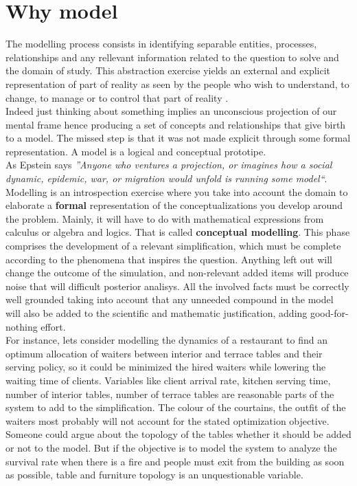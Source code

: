 \documentclass[11pt,oneside,a4paper,openright]{report}
\begin{document}
\section{Why model}
%
The modelling process consists in identifying separable entities, processes, relationships and any rellevant information related to the question to solve and the domain of study. 
This abstraction exercise yields an external and explicit representation of part of reality as seen by the
people who wish to understand, to change, to manage or to control that part of reality \cite{Pidd2003}.\\
Indeed just thinking about something implies an unconscious projection of our mental frame hence producing a set of concepts and relationships that give birth to a model. The missed step is that it was not made explicit through some formal representation. A model is a logical and conceptual prototipe.\\
As Epstein \cite[p.1]{Epstein2008} says \textit{''Anyone who ventures a projection, or imagines how a social dynamic, epidemic, war, or migration would unfold is running some model``}.\\
Modelling is an introspection exercise where you take into account the domain to elaborate a \textbf{formal} representation of the conceptualizations you develop around the problem. Mainly, it will have to do with mathematical expressions from calculus or algebra and logics. That is called \textbf{conceptual modelling}. This phase comprises the development of a relevant simplification, which must be complete according to the phenomena that inspires the question. Anything left out will change the outcome of the simulation, and non-relevant added items will produce noise that will difficult posterior analisys. All the involved facts must be correctly well grounded taking into account that any unneeded compound in the model will also be added to the scientific and mathematic justification, adding good-for-nothing effort.\\
For instance, lets consider modelling the dynamics of a restaurant to find an optimum allocation of waiters between interior and terrace tables and their serving policy, so it could be minimized the hired waiters while lowering the waiting time of clients. Variables like client arrival rate, kitchen serving time, number of interior tables, number of terrace tables are reasonable parts of the system to add to the simplification. The colour of the courtains, the outfit of the waiters most probably will not account for the stated optimization objective. Someone could argue about the topology of the tables whether it should be added or not to the model. But if the objective is to model the system to analyze the survival rate when there is a fire and people must exit from the building as soon as possible, table and furniture topology is an unquestionable variable.\\
\end{document}
